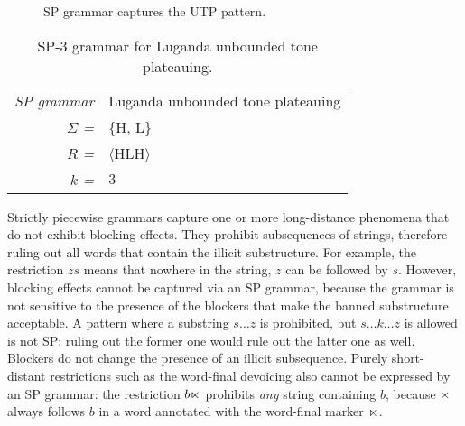 \begin{figure}[h!]
\begin{center}
\hspace{3em}
\end{center}
\caption{SP grammar captures the UTP pattern.}
\label{imdlawngoodsp}
\end{figure}

{
\renewcommand{\tablename}{Grammar}
\begin{table}[h!]
\begin{center}
\begin{tabular}{rl}
\textit{SP grammar}  & Luganda unbounded tone plateauing \\
\textit{$\Sigma$ =}      &  \{H, L\}   \\
\textit{$R$ =} & $\langle$HLH$\rangle$  \\
\textit{$k$ =}      & $3$          
\end{tabular}
\caption{SP-$3$ grammar for Luganda unbounded tone plateauing.}
\label{utpsuccessfulsp}
\end{center}
\end{table}
}

Strictly piecewise grammars capture one or more long-distance phenomena that do not exhibit blocking effects.
They prohibit subsequences of strings, therefore ruling out all words that contain the illicit substructure.
For example, the restriction $zs$ means that nowhere in the string, $z$ can be followed by $s$.
However, blocking effects cannot be captured via an SP grammar, because the grammar is not sensitive to the presence of the blockers that make the banned substructure acceptable.
A pattern where a substring $s\dots z$ is prohibited, but $s\dots k \dots z$ is allowed is not SP: ruling out the former one would rule out the latter one as well.
Blockers do not change the presence of an illicit subsequence.
Purely short-distant restrictions such as the word-final devoicing also cannot be expressed by an SP grammar: the restriction $b\ltimes$ prohibits \emph{any} string containing $b$, because $\ltimes$ always follows $b$ in a word annotated with the word-final marker $\ltimes$.






